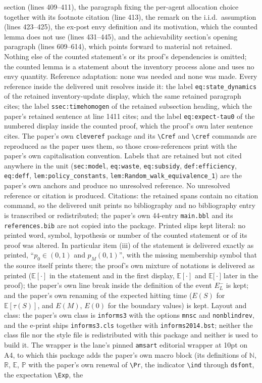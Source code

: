 \documentclass[10pt,a4paper]{amsart}
\theoremstyle{plain}
\theoremstyle{definition}
\theoremstyle{remark}
\newcommand{\N}{\mathbb{N}}
\newcommand{\R}{\mathbb{R}}
\newcommand{\E}{\mathbb{E}}
\newcommand{\pr}{\mathbb{P}}
\newcommand{\Exp}[1]{\mathbb{E} \left[ #1 \right]}
\begin{document}
section (lines 409--411), the paragraph fixing the per-agent allocation choice together with its footnote citation (line 413), the remark on the i.i.d.\ assumption (lines 423--425), the ex-post envy definition and its motivation, which the counted lemma does not use (lines 431--445), and the achievability section's opening paragraph (lines 609--614), which points forward to material not retained. Nothing else of the counted statement's or its proof's dependencies is omitted; the counted lemma is a statement about the inventory process alone and uses no envy quantity. Reference adaptation: none was needed and none was made. Every reference inside the delivered unit resolves inside it: the label \texttt{eq:state\_dynamics} of the retained inventory-update display, which the same retained paragraph cites; the label \texttt{ssec:timehomogen} of the retained subsection heading, which the paper's retained sentence at line 1411 cites; and the label \texttt{eq:expect-tau0} of the numbered display inside the counted proof, which the proof's own later sentence cites. The paper's own \texttt{cleveref} package and its \texttt{\textbackslash Cref} and \texttt{\textbackslash cref} commands are reproduced as the paper uses them, so those cross-references print with the paper's own capitalisation convention. Labels that are retained but not cited anywhere in the unit (\texttt{sec:model}, \texttt{eq:waste}, \texttt{eq:subsidy}, \texttt{def:efficiency}, \texttt{eq:deff}, \texttt{lem:policy\_constants}, \texttt{lem:Random\_walk\_equivalence\_1}) are the paper's own anchors and produce no unresolved reference. No unresolved reference or citation is produced. Citations: the retained spans contain no citation command, so the delivered unit prints no bibliography and no bibliography entry is transcribed or redistributed; the paper's own 44-entry \texttt{main.bbl} and its \texttt{references.bib} are not copied into the package. Printed slips kept literal: no printed word, symbol, hypothesis or number of the counted statement or of its proof was altered. In particular item (iii) of the statement is delivered exactly as printed, ``$p_0 \in (0,1)$ and $p_M (0,1)$'', with the missing membership symbol that the source itself prints there; the proof's own mixture of notations is delivered as printed ($\Exp{\cdot}$ in the statement and in the first display, $\mathbb{E}[\cdot]$ and $\mathbb{E}\big[\cdot\big]$ later in the proof); the paper's own line break inside the definition of the event $E^-_L$ is kept; and the paper's own renaming of the expected hitting time ($E(S)$ for $\Exp{\tau(S)}$, and $E(M)$, $E(0)$ for the boundary values) is kept. Layout and class: the paper's own class is \texttt{informs3} with the options \texttt{mnsc} and \texttt{nonblindrev}, and the e-print ships \texttt{informs3.cls} together with \texttt{informs2014.bst}; neither the class file nor the style file is redistributed with this package and neither is used to build it. The wrapper is the lane's pinned \texttt{amsart} editorial wrapper at 10pt on A4, to which this package adds the paper's own macro block (its definitions of $\N$, $\R$, $\E$, $\pr$ with the paper's own renewal of \texttt{\textbackslash Pr}, the indicator \texttt{\textbackslash ind} through \texttt{dsfont}, the expectation \texttt{\textbackslash Exp}, the 
\end{document}
